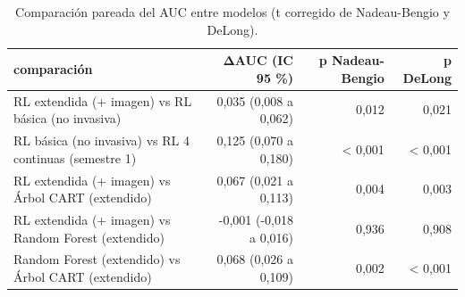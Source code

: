 \begin{table}[H]
\caption{Comparación pareada del AUC entre modelos (t corregido de Nadeau-Bengio y DeLong).}
\label{tab:comparacion}
\begin{tabular}{lrrr}
\toprule
comparación & ΔAUC (IC 95 \%) & p Nadeau-Bengio & p DeLong \\
\midrule
RL extendida (+ imagen) vs RL básica (no invasiva) & 0,035 (0,008 a 0,062) & 0,012 & 0,021 \\
RL básica (no invasiva) vs RL 4 continuas (semestre 1) & 0,125 (0,070 a 0,180) & < 0,001 & < 0,001 \\
RL extendida (+ imagen) vs Árbol CART (extendido) & 0,067 (0,021 a 0,113) & 0,004 & 0,003 \\
RL extendida (+ imagen) vs Random Forest (extendido) & -0,001 (-0,018 a 0,016) & 0,936 & 0,908 \\
Random Forest (extendido) vs Árbol CART (extendido) & 0,068 (0,026 a 0,109) & 0,002 & < 0,001 \\
\bottomrule
\end{tabular}
\end{table}
